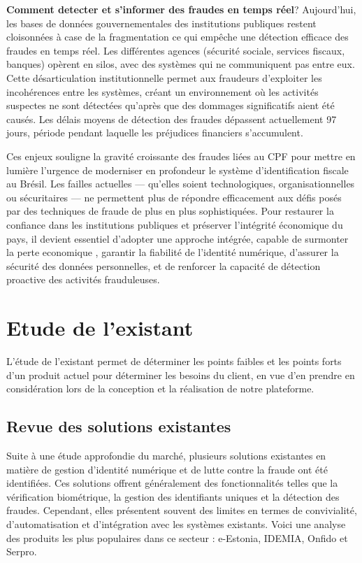 \textbf{Comment detecter et s'informer des fraudes en temps réel}? Aujourd'hui, les bases de données gouvernementales des institutions publiques restent cloisonnées à case de la fragmentation ce qui empêche une détection efficace des fraudes en temps réel. Les différentes agences (sécurité sociale, services fiscaux, banques) opèrent en silos, avec des systèmes qui ne communiquent pas entre eux. Cette désarticulation institutionnelle permet aux fraudeurs d'exploiter les incohérences entre les systèmes, créant un environnement où les activités suspectes ne sont détectées qu'après que des dommages significatifs aient été causés. Les délais moyens de détection des fraudes dépassent actuellement 97 jours, période pendant laquelle les préjudices financiers s'accumulent.

Ces enjeux souligne la gravité croissante des fraudes liées au CPF pour mettre en lumière l'urgence de moderniser en profondeur le système d'identification fiscale au Brésil. Les failles actuelles — qu'elles soient technologiques, organisationnelles ou sécuritaires — ne permettent plus de répondre efficacement aux défis posés par des techniques de fraude de plus en plus sophistiquées. Pour restaurer la confiance dans les institutions publiques et préserver l'intégrité économique du pays, il devient essentiel d'adopter une approche intégrée, capable de surmonter la perte economique , garantir la fiabilité de l'identité numérique, d'assurer la sécurité des données personnelles, et de renforcer la capacité de détection proactive des activités frauduleuses.


\section{Etude de l'existant}
L'étude de l'existant permet de déterminer les points faibles et les points forts d'un produit actuel pour déterminer les besoins du client, en vue d'en prendre en considération lors de la conception et la réalisation de notre plateforme.
\subsection{Revue des solutions existantes}
Suite à une étude approfondie du marché, plusieurs solutions existantes en matière de gestion d'identité numérique et de lutte contre la fraude ont été identifiées. Ces solutions offrent généralement des fonctionnalités telles que la vérification biométrique, la gestion des identifiants uniques et la détection des fraudes. Cependant, elles présentent souvent des limites en termes de convivialité, d'automatisation et d'intégration avec les systèmes existants. Voici une analyse des produits les plus populaires dans ce secteur :  e-Estonia, IDEMIA, Onfido et Serpro.

